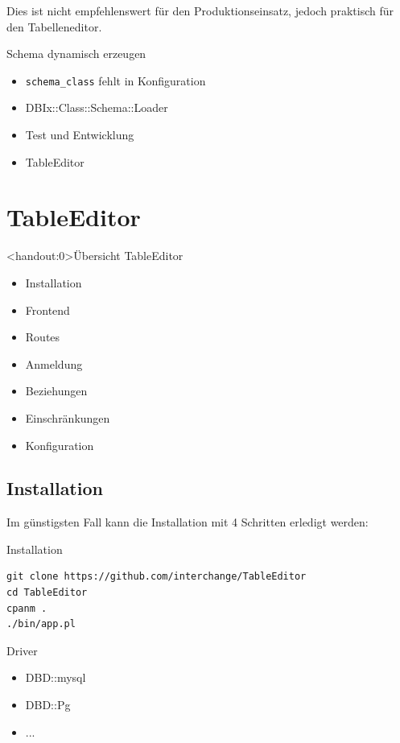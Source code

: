 Dies ist nicht empfehlenswert für den Produktionseinsatz, jedoch
praktisch für den Tabelleneditor.

\begin{frame}[fragile]{Schema dynamisch erzeugen}
\begin{itemize}
\item \verb|schema_class| fehlt in Konfiguration
\item DBIx::Class::Schema::Loader
\item Test und Entwicklung
\item TableEditor
\end{itemize}
\end{frame}

\section{TableEditor}

\begin{frame}<handout:0>{Übersicht TableEditor}
\begin{itemize}
\item Installation
\item Frontend
\item Routes
\item Anmeldung
\item Beziehungen
\item Einschränkungen
\item Konfiguration
\end{itemize}
\end{frame}

\subsection{Installation}
Im günstigsten Fall kann die Installation mit 4 Schritten
erledigt werden:

\begin{frame}[fragile]{Installation}
\begin{lstlisting}
git clone https://github.com/interchange/TableEditor
cd TableEditor
cpanm .
./bin/app.pl
\end{lstlisting}
\end{frame}

\begin{frame}[fragile]{Driver}
\begin{itemize}
\item DBD::mysql
\item DBD::Pg
\item ...
\end{itemize}
\end{frame}


